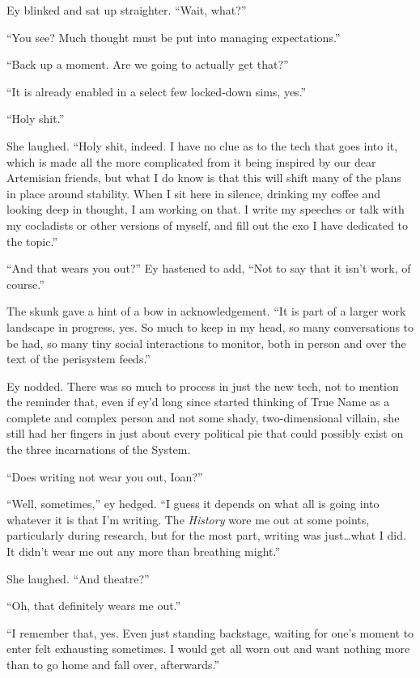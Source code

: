 Ey blinked and sat up straighter. ``Wait, what?''

``You see? Much thought must be put into managing expectations.''

``Back up a moment. Are we going to actually get that?''

``It is already enabled in a select few locked-down sims, yes.''

``Holy shit.''

She laughed. ``Holy shit, indeed. I have no clue as to the tech that goes into it, which is made all the more complicated from it being inspired by our dear Artemisian friends, but what I do know is that this will shift many of the plans in place around stability. When I sit here in silence, drinking my coffee and looking deep in thought, I am working on that. I write my speeches or talk with my cocladists or other versions of myself, and fill out the exo I have dedicated to the topic.''

``And that wears you out?'' Ey hastened to add, ``Not to say that it isn't work, of course.''

The skunk gave a hint of a bow in acknowledgement. ``It is part of a larger work landscape in progress, yes. So much to keep in my head, so many conversations to be had, so many tiny social interactions to monitor, both in person and over the text of the perisystem feeds.''

Ey nodded. There was so much to process in just the new tech, not to mention the reminder that, even if ey'd long since started thinking of True Name as a complete and complex person and not some shady, two-dimensional villain, she still had her fingers in just about every political pie that could possibly exist on the three incarnations of the System.

``Does writing not wear you out, Ioan?''

``Well, sometimes,'' ey hedged. ``I guess it depends on what all is going into whatever it is that I'm writing. The \emph{History} wore me out at some points, particularly during research, but for the most part, writing was just\ldots what I did. It didn't wear me out any more than breathing might.''

She laughed. ``And theatre?''

``Oh, that definitely wears me out.''

``I remember that, yes. Even just standing backstage, waiting for one's moment to enter felt exhausting sometimes. I would get all worn out and want nothing more than to go home and fall over, afterwards.''

